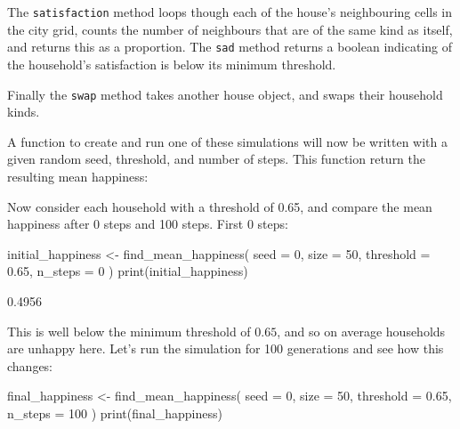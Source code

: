 The \texttt{satisfaction} method loops though each of the house's
neighbouring cells in the city grid, counts the number of neighbours that are of
the same kind as itself, and returns this as a proportion.
The \texttt{sad} method returns a boolean indicating of the
household's satisfaction is below its minimum threshold.

Finally the \texttt{swap} method takes another house object, and
swaps their household kinds.

A function to create and run one of these simulations will now be written
with a given random seed, threshold, and number of steps. This function return
the resulting mean happiness:


Now consider each household with a threshold of
0.65, and compare the mean happiness after 0 steps and 100 steps.
First 0 steps:

\begin{Rin}
initial_happiness <- find_mean_happiness(
  seed = 0,
  size = 50,
  threshold = 0.65,
  n_steps = 0
)
print(initial_happiness)
\end{Rin}

\begin{Rout}
[1] 0.4956
\end{Rout}

This is well below the minimum threshold of \(0.65\), and so on average
households are unhappy here.
Let's run the simulation for 100 generations and see how this changes:

\begin{Rin}
final_happiness <- find_mean_happiness(
  seed = 0,
  size = 50,
  threshold = 0.65,
  n_steps = 100
)
print(final_happiness)
\end{Rin}

